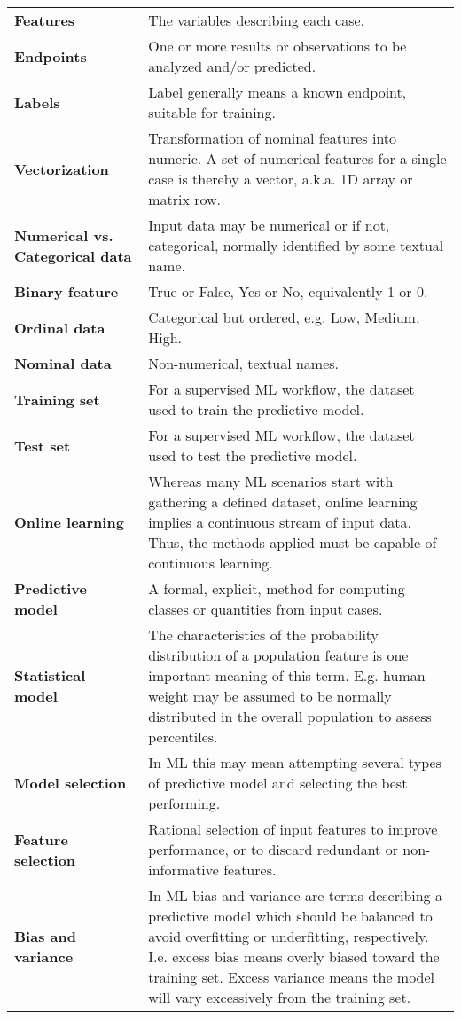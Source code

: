 \begin{appendices}
\begin{table}
\begin{tabular}{p{0.3\linewidth}p{0.7\linewidth}}
\textbf{Features} & The variables describing each case. \\
\textbf{Endpoints} & One or more results or observations to be analyzed and/or predicted. \\
\textbf{Labels} & Label generally means a known endpoint, suitable for training. \\
\textbf{Vectorization} & Transformation of nominal features into numeric.  A set of numerical features for a single case is thereby a vector, a.k.a. 1D array or matrix row. \\
\textbf{Numerical vs. Categorical data} & Input data may be numerical or if not, categorical, normally identified by some textual name. \\
\textbf{Binary feature} & True or False, Yes or No, equivalently 1 or 0. \\
\textbf{Ordinal data} & Categorical but ordered, e.g. Low, Medium, High. \\
\textbf{Nominal data} & Non-numerical, textual names. \\
\textbf{Training set} & For a supervised ML workflow, the dataset used to train the predictive model. \\
\textbf{Test set} & For a supervised ML workflow, the dataset used to test the predictive model. \\
\textbf{Online learning} & Whereas many ML scenarios start with gathering a defined dataset, online learning implies a continuous stream of input data.  Thus, the methods applied must be capable of continuous learning. \\
\textbf{Predictive model} & A formal, explicit, method for computing classes or quantities from input cases. \\
\textbf{Statistical model} & The characteristics of the probability distribution of a population feature is one important meaning of this term.  E.g. human weight may be assumed to be normally distributed in the overall population to assess percentiles. \\
\textbf{Model selection} & In ML this may mean attempting several types of predictive model and selecting the best performing. \\
\textbf{Feature selection} & Rational selection of input features to improve performance, or to discard redundant or non-informative features. \\
\textbf{Bias and variance} & In ML bias and variance are terms describing a predictive model which should be balanced to avoid overfitting or underfitting, respectively.  I.e. excess bias means overly biased toward the training set.  Excess variance means the model will vary excessively from the training set. \\

\end{tabular}
\end{table}
\end{appendices}
